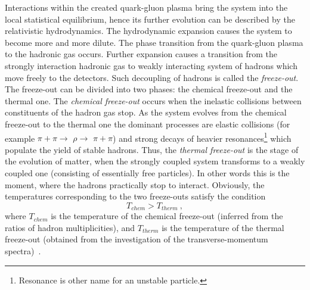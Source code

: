      Interactions within the created quark-gluon plasma bring the system into the local statistical equilibrium, hence its further evolution can be described by the relativistic hydrodynamics.
      The hydrodynamic expansion causes the system to become more and more dilute.
      The phase transition from the quark-gluon plasma to the hadronic gas occurs.
      Further expansion causes a transition from the strongly interaction hadronic gas to weakly interacting system of hadrons which move freely to the detectors.
      Such decoupling of hadrons is called the \textit{freeze-out}.
      The freeze-out can be divided into two phases: the chemical freeze-out and the thermal one.
      The \textit{chemical freeze-out} occurs when the inelastic collisions between constituents of the hadron gas stop.
      As the system evolves from the chemical freeze-out to the thermal one the dominant processes are elastic collisions (for example $\pi+\pi\to$ $\rho \to$ $\pi+\pi$) and strong decays of heavier resonances\footnote{Resonance is other name for an unstable particle.} which populate the yield of stable hadrons.
      Thus, the \textit{thermal freeze-out} is the stage of the evolution of matter, when the strongly coupled system transforms to a weakly coupled one (consisting of essentially free particles).
      In other words this is the moment, where the hadrons practically stop to interact.
      Obviously, the temperatures corresponding to the two freeze-outs satisfy the condition
      \begin{equation}
        T_{chem} > T_{therm}~,
      \end{equation}
      where $T_{chem}$ is the temperature of the chemical freeze-out (inferred from the ratios of hadron multiplicities), and $T_{therm}$ is the temperature of the thermal freeze-out (obtained from the investigation of the transverse-momentum spectra)~\cite{florkowski}.

